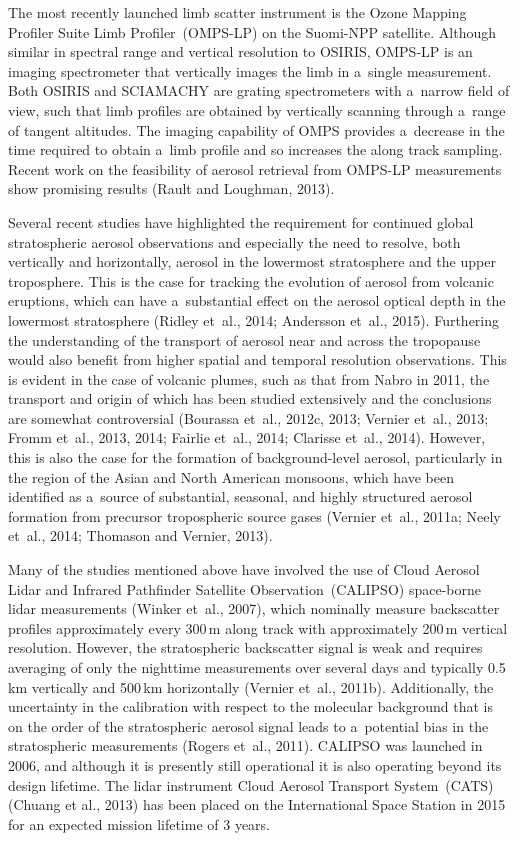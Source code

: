 \documentclass[amt]{copernicus}
\begin{document}
The most recently launched limb scatter instrument is the Ozone
Mapping Profiler Suite Limb Profiler~(OMPS-LP) on the Suomi-NPP
satellite. Although similar in spectral range and vertical resolution
to OSIRIS, OMPS-LP is an imaging spectrometer that vertically images
the limb in a~single measurement. Both OSIRIS and SCIAMACHY are
grating spectrometers with a~narrow field of view, such that limb
profiles are obtained by vertically scanning through a~range of
tangent altitudes. The imaging capability of OMPS provides a~decrease
in the time required to obtain a~limb profile and so increases the
along track sampling. Recent work on the feasibility of aerosol
retrieval from OMPS-LP measurements show promising results (Rault and
Loughman, 2013).

Several recent studies have highlighted the requirement for continued global
stratospheric aerosol observations and especially the need to resolve, both
vertically and horizontally, aerosol in the lowermost stratosphere and the
upper troposphere. This is the case for tracking the evolution of aerosol
from volcanic eruptions, which can have a~substantial effect on the aerosol
optical depth in the lowermost stratosphere (Ridley et~al., 2014; Andersson
et~al., 2015). Furthering the understanding of the transport of aerosol near
and across the tropopause would also benefit from higher spatial and temporal
resolution observations. This is evident in the case of volcanic plumes, such
as that from Nabro in 2011, the transport and origin of which has been
studied extensively and the conclusions are somewhat controversial (Bourassa et~al., 2012c,
2013; Vernier et~al., 2013; Fromm et~al., 2013, 2014; Fairlie et~al., 2014;
Clarisse et~al., 2014). However, this is also the case for the formation of
background-level aerosol, particularly in the region of the Asian and North
American monsoons, which have been identified as a~source of substantial,
seasonal, and highly structured aerosol formation from precursor tropospheric
source gases (Vernier et~al., 2011a; Neely et~al., 2014; Thomason and
Vernier, 2013).

Many of the studies mentioned above have involved the use of Cloud
Aerosol Lidar and Infrared Pathfinder Satellite Observation~(CALIPSO)
space-borne lidar measurements (Winker et~al., 2007), which nominally
measure backscatter profiles approximately every 300\,\unit{m} along
track with approximately 200\,\unit{m} vertical resolution. However,
the stratospheric backscatter signal is weak and requires averaging of
only the nighttime measurements over several days and typically
0.5\,\unit{km} vertically and 500\,\unit{km} horizontally (Vernier
et~al., 2011b). Additionally, the uncertainty in the calibration with
respect to the molecular background that is on the order of the
stratospheric aerosol signal leads to a~potential bias in the
stratospheric measurements (Rogers et~al., 2011). CALIPSO was launched
in 2006, and although it is presently still operational it is also
operating beyond its design lifetime. The lidar instrument Cloud Aerosol Transport System~(CATS)
(Chuang et al., 2013) has been placed on the International Space Station in 2015 for an expected mission lifetime of 3 years.
\end{document}

